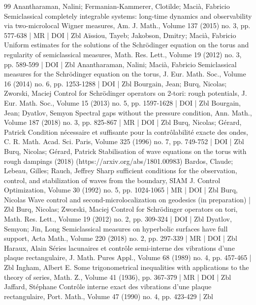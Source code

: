 \documentclass[10pt]{amsart}
\theoremstyle{definition}\newtheorem{defi}[theo]{Definition}\newtheorem{rema}[theo]{Remark}\newtheorem{exam}[theo]{Example}\newtheorem{exem}[theo]{Example}\newtheorem{nota}[theo]{Notation}
\begin{document}
\begin{thebibliography}{99}
Anantharaman, Nalini; Fermanian-Kammerer, Clotilde; Macià, Fabricio Semiclassical completely integrable systems: long-time dynamics and observability via two-microlocal Wigner measures, Am. J. Math., Volume 137 (2015) no. 3, pp. 577-638 | MR | DOI | Zbl
Aïssiou, Tayeb; Jakobson, Dmitry; Macià, Fabricio Uniform estimates for the solutions of the Schrödinger equation on the torus and regularity of semiclassical measures, Math. Res. Lett., Volume 19 (2012) no. 3, pp. 589-599 | DOI | Zbl
Anantharaman, Nalini; Macià, Fabricio Semiclassical measures for the Schrödinger equation on the torus, J. Eur. Math. Soc., Volume 16 (2014) no. 6, pp. 1253-1288 | DOI | Zbl
Bourgain, Jean; Burq, Nicolas; Zworski, Maciej Control for Schrödinger operators on 2-tori: rough potentials, J. Eur. Math. Soc., Volume 15 (2013) no. 5, pp. 1597-1628 | DOI | Zbl
Bourgain, Jean; Dyatlov, Semyon Spectral gaps without the pressure condition, Ann. Math., Volume 187 (2018) no. 3, pp. 825-867 | MR | DOI | Zbl
Burq, Nicolas; Gérard, Patrick Condition nécessaire et suffisante pour la contrôlabilité exacte des ondes, C. R. Math. Acad. Sci. Paris, Volume 325 (1996) no. 7, pp. 749-752 | DOI | Zbl
Burq, Nicolas; Gérard, Patrick Stabilisation of wave equations on the torus with rough dampings (2018) (https://arxiv.org/abs/1801.00983)
Bardos, Claude; Lebeau, Gilles; Rauch, Jeffrey Sharp sufficient conditions for the observation, control, and stabilization of waves from the boundary, SIAM J. Control Optimization, Volume 30 (1992) no. 5, pp. 1024-1065 | MR | DOI | Zbl
Burq, Nicolas Wave control and second-microlocalization on geodesics (in preparation) | Zbl
Burq, Nicolas; Zworski, Maciej Control for Schrödinger operators on tori, Math. Res. Lett., Volume 19 (2012) no. 2, pp. 309-324 | DOI | Zbl
Dyatlov, Semyon; Jin, Long Semiclassical measures on hyperbolic surfaces have full support, Acta Math., Volume 220 (2018) no. 2, pp. 297-339 | MR | DOI | Zbl
Haraux, Alain Séries lacunaires et contrôle semi-interne des vibrations d’une plaque rectangulaire, J. Math. Pures Appl., Volume 68 (1989) no. 4, pp. 457-465 | Zbl
Ingham, Albert E. Some trigonometrical inequalities with applications to the theory of series, Math. Z., Volume 41 (1936), pp. 367-379 | MR | DOI | Zbl
Jaffard, Stéphane Contrôle interne exact des vibrations d’une plaque rectangulaire, Port. Math., Volume 47 (1990) no. 4, pp. 423-429 | Zbl

\end{thebibliography}
\end{document}
